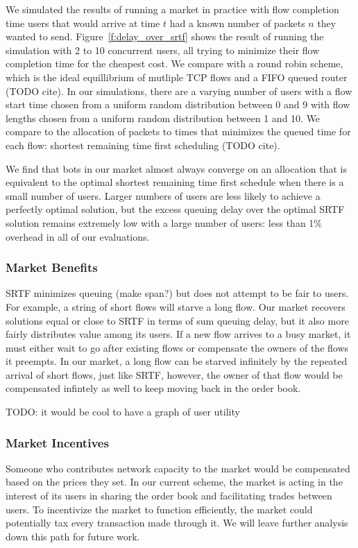 We simulated the results of running a market in practice with flow completion time users that would arrive at time $t$ had a known number of packets $n$ they wanted to send.
Figure~\ref{f:delay_over_srtf} shows the result of running the simulation with 2 to 10 concurrent users, all trying to minimize their flow completion time for the cheapest cost.
We compare with a round robin scheme, which is the ideal equillibrium of mutliple TCP flows and a FIFO queued router (TODO cite).
In our simulations, there are a varying number of users with a flow start time chosen from a uniform random distribution between 0 and 9 with flow lengths chosen from a uniform random distribution between 1 and 10. We compare to the allocation of packets to times that minimizes the queued time for each flow: shortest remaining time first scheduling (TODO cite).

We find that bots in our market almost always converge on an allocation that is equivalent to the optimal shortest remaining time first schedule when there is a small number of users. Larger numbers of users are less likely to achieve a perfectly optimal solution, but the excess queuing delay over the optimal SRTF solution remains extremely low with a large number of users: less than 1\% overhead in all of our evaluations.

\subsubsection{Market Benefits}
SRTF minimizes queuing (make span?) but does not attempt to be fair to users. For example, a string of short flows will starve a long flow.
Our market recovers solutions equal or close to SRTF in terms of sum queuing delay, but it also more fairly distributes value among its users.
If a new flow arrives to a busy market, it must either wait to go after existing flows or compensate the owners of the flows it preempts. In our market, a long flow can be starved infinitely by the repeated arrival of short flows, just like SRTF, however, the owner of that flow would be compensated infintely as well to keep moving back in the order book.

TODO: it would be cool to have a graph of user utility
\subsubsection{Market Incentives}
Someone who contributes network capacity to the market would be compensated based on the prices they set.
In our current scheme, the market is acting in the interest of its users in sharing the order book and facilitating trades between users.
To incentivize the market to function efficiently, the market could potentially tax every transaction made through it. We will leave further analysis down this path for future work.

